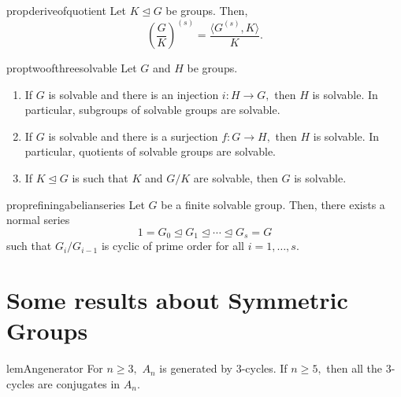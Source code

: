 \begin{restatable}[]{prop}{deriveofquotient}
\label{prop:deriveofquotient}
	Let $K \unlhd G$ be groups. Then,
	\begin{equation*} 
		\left(\frac{G}{K}\right)^{(s)} = \frac{\langle G^{(s)}, K\rangle}{K}.
	\end{equation*}
	\hfill\hyperref[prop:deriveofquotient2]{\downsym}
\end{restatable}

\begin{restatable}[]{prop}{twoofthreesolvable}
\label{prop:twoofthreesolvable}
	Let $G$ and $H$ be groups.
	\begin{enumerate}
	 	\item If $G$ is solvable and there is an injection $i : H \to G,$ then $H$ is solvable. In particular, subgroups of solvable groups are solvable.
	 	\item If $G$ is solvable and there is a surjection $f : G \to H,$ then $H$ is solvable. In particular, quotients of solvable groups are solvable.
	 	\item If $K \unlhd G$ is such that $K$ and $G/K$ are solvable, then $G$ is solvable. \hfill\hyperref[prop:twoofthreesolvable2]{\downsym}
	\end{enumerate} 
\end{restatable}

\begin{restatable}[]{prop}{refiningabelianseries}
\label{prop:refiningabelianseries}
	Let $G$ be a finite solvable group. Then, there exists a normal series
	\begin{equation*} 
		1 = G_0 \unlhd G_1 \unlhd \cdots \unlhd G_s = G
	\end{equation*}
	such that $G_i/G_{i - 1}$ is cyclic of prime order for all $i = 1, \ldots, s.$ \hfill\hyperref[prop:refiningabelianseries2]{\downsym}
\end{restatable}

\section{Some results about Symmetric Groups}

\begin{restatable}[]{lem}{Angenerator}
\label{lem:Angenerator}
	For $n \ge 3,$ $A_n$ is generated by $3$-cycles. If $n \ge 5,$ then all the $3$-cycles are conjugates in $A_n.$ \hfill\hyperref[lem:Angenerator2]{\downsym}
\end{restatable}

